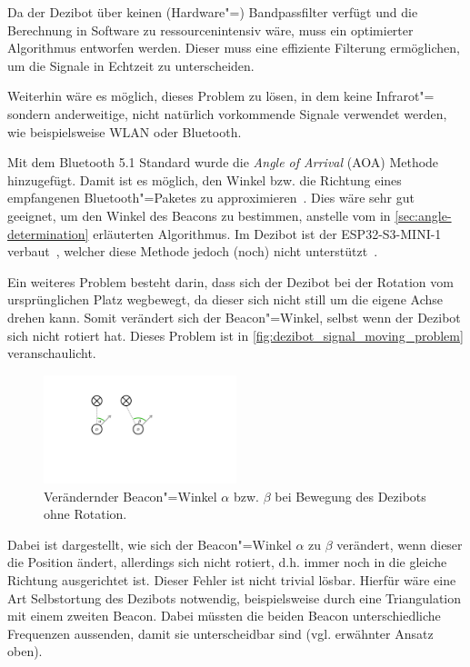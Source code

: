 Da der Dezibot über keinen (Hardware"=) Bandpassfilter verfügt und die Berechnung in Software zu ressourcenintensiv wäre, muss ein optimierter Algorithmus entworfen werden. Dieser muss eine effiziente Filterung ermöglichen, um die Signale in Echtzeit zu unterscheiden.

Weiterhin wäre es möglich, dieses Problem zu lösen, in dem keine Infrarot"= sondern anderweitige, nicht natürlich vorkommende Signale verwendet werden, wie beispielsweise WLAN oder Bluetooth.

Mit dem Bluetooth 5.1 Standard wurde die \emph{Angle of Arrival} (AOA) Methode hinzugefügt. Damit ist es möglich, den Winkel bzw. die Richtung eines empfangenen Bluetooth"=Paketes zu approximieren~\cite[][Abschnitt 8.1]{bluetoothsigincBluetoothCoreSpecification2019}. Dies wäre sehr gut geeignet, um den Winkel des Beacons zu bestimmen, anstelle vom in \autoref{sec:angle-determination} erläuterten Algorithmus. Im Dezibot ist der ESP32-S3-MINI-1 verbaut~\cite{fingerleDokumentationDezibot42025}, welcher diese Methode jedoch (noch) nicht unterstützt~\cite{espressifsystemsshanghaico.ltdMajorFeatureSupport2024}.

Ein weiteres Problem besteht darin, dass sich der Dezibot bei der Rotation vom ursprünglichen Platz wegbewegt, da dieser sich nicht still um die eigene Achse drehen kann. Somit verändert sich der Beacon"=Winkel, selbst wenn der Dezibot sich nicht rotiert hat. Dieses Problem ist in \autoref{fig:dezibot_signal_moving_problem} veranschaulicht.

\begin{figure}[h]
    \centering
    \includegraphics[width=0.5\textwidth]{../assets/dezibot_signal_moving_problem.pdf}
    \caption{Verändernder Beacon"=Winkel $\alpha$ bzw. $\beta$ bei Bewegung des Dezibots ohne Rotation.}
    \label{fig:dezibot_signal_moving_problem}
\end{figure}

Dabei ist dargestellt, wie sich der Beacon"=Winkel $\alpha$ zu $\beta$ verändert, wenn dieser die Position ändert, allerdings sich nicht rotiert, d.h. immer noch in die gleiche Richtung ausgerichtet ist. Dieser Fehler ist nicht trivial lösbar. Hierfür wäre eine Art Selbstortung des Dezibots notwendig, beispielsweise durch eine Triangulation mit einem zweiten Beacon. Dabei müssten die beiden Beacon unterschiedliche Frequenzen aussenden, damit sie unterscheidbar sind (vgl. erwähnter Ansatz oben).

